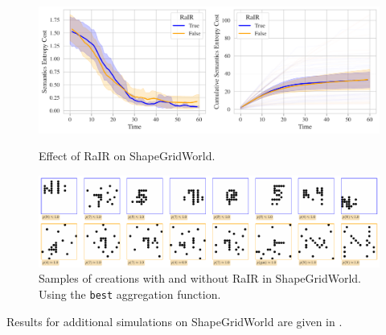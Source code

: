 \begin{figure}[h]
    \centering
    \includegraphics[width=\textwidth]{images/rair_comparison_sgw_categories.pdf}
    \caption{Effect of RaIR on ShapeGridWorld.}
    \label{fig:rair-sgw}
    \vspace{12pt}
    \includegraphics[width=\textwidth]{images/rair_samples_sgw_categories.pdf}
    \caption[Samples of creations with and without RaIR in ShapeGridWorld.]{Samples of creations with and without RaIR in ShapeGridWorld. Using the \texttt{best} aggregation function.}
    \label{fig:rair-samples-sgw}
\end{figure}




Results for additional simulations on ShapeGridWorld are given in .
